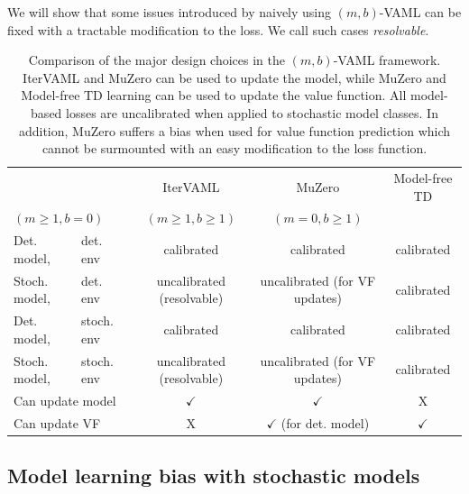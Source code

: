 We will show that some issues introduced by naively using $(m,b)$-VAML can be fixed with a tractable modification to the loss.
We call such cases \emph{resolvable}.


\begin{table}
{\footnotesize
\centering
    \begin{tabular}{l l|c|c|c}
        && IterVAML &  MuZero &  Model-free TD \\
        \multicolumn{2}{l|}{$(m\geq1,b=0)$} &  $(m\geq1,b\geq1)$& $(m=0,b\geq1)$\\\hline
        Det. model,& det. env & {\color{newbluedeal} calibrated} & {\color{newbluedeal} calibrated} & {\color{newbluedeal} calibrated} \\
        Stoch. model,& det. env & {\color{newgreendeal} uncalibrated (resolvable)} & {\color{uoftred} uncalibrated (for VF updates)} & {\color{newbluedeal} calibrated}\\
        Det. model,& stoch. env & {\color{newbluedeal} calibrated} & {\color{newbluedeal} calibrated}  & {\color{newbluedeal} calibrated} \\
        Stoch. model,& stoch. env & {\color{newgreendeal} uncalibrated (resolvable)} & {\color{uoftred} uncalibrated (for VF updates)} & {\color{newbluedeal} calibrated} \\\hline
        \multicolumn{2}{l|}{Can update model} & {\color{newbluedeal} $\checkmark$} & {\color{newbluedeal} $\checkmark$}& \color{uoftred} X \\
        \multicolumn{2}{l|}{Can update VF}   & \color{uoftred} X & {\color{newgreendeal} $\checkmark$ (for det. model)}  & {\color{newbluedeal} $\checkmark$}
    \end{tabular}}
    \caption{Comparison of the major design choices in the $(m,b)$-VAML framework. IterVAML and MuZero can be used to update the model, while MuZero and Model-free TD learning can be used to update the value function. All model-based losses are uncalibrated when applied to stochastic model classes. In addition, MuZero suffers a bias when used for value function prediction which cannot be surmounted with an easy modification to the loss function.}
    \label{tab:cvaml:bias_overview}
\end{table}

\subsection{Model learning bias with stochastic models}

